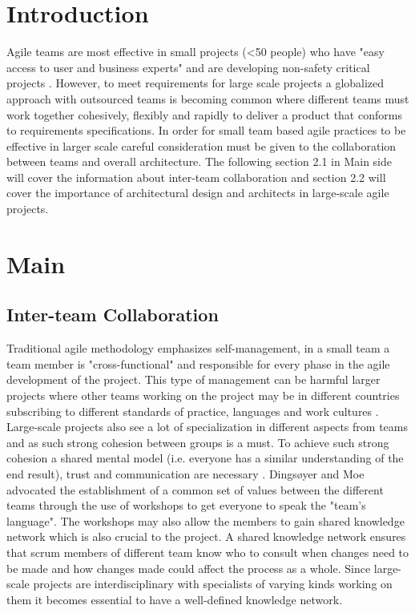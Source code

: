 \documentclass[sigconf]{acmart}
\begin{document}
\section{Introduction}

Agile teams are most effective in small projects (<50 people) who have "easy access to user and business experts" and are developing non-safety critical projects \cite{Dingsøyr14}. However, to meet requirements for large scale projects a globalized approach with outsourced teams is becoming common \cite{Sutherland07} where different teams must work together cohesively, flexibly and rapidly to deliver  a product that conforms to requirements specifications. In order for small team based agile practices to be effective in larger scale careful consideration must be given to the collaboration between teams and overall architecture. The following section 2.1 in Main side will cover the information about inter-team collaboration and section 2.2 will cover the importance of architectural design and architects in large-scale agile projects. 
\section{Main}

\subsection{Inter-team Collaboration}
Traditional agile methodology emphasizes self-management\cite{Dingsøyr14}, in a small team a team member is "cross-functional" and responsible for every phase in the agile development of the project. This type of management can be harmful larger projects where other teams working on the project may be in different countries subscribing to different standards of practice, languages and work cultures \cite{Sutherland07}. Large-scale projects also see a lot of specialization in different aspects from teams and as such strong cohesion between groups is a must. To achieve such strong cohesion a shared mental model (i.e. everyone has a similar understanding of the end result), trust and communication are necessary \cite{Bjørnson18}. Dings{\o}yer and Moe advocated the establishment of a common set of values between the different teams through the use of workshops to get everyone to speak the "team's language"\cite{Dingsøyr14}.  The workshops may also allow the members to gain  shared knowledge network  which is also crucial to the project. A shared knowledge network ensures that scrum members of different team know who to consult when changes need to be made and how changes made could affect the process as a whole. Since large-scale projects are interdisciplinary with specialists of varying kinds working on them it becomes essential to have a well-defined knowledge network. 
\end{document}
